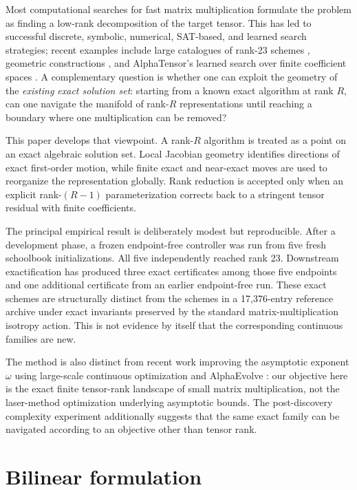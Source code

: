 \documentclass[11pt]{article}
\begin{document}
Most computational searches for fast matrix multiplication formulate the problem as finding a low-rank decomposition of the target tensor.  This has led to successful discrete, symbolic, numerical, SAT-based, and learned search strategies; recent examples include large catalogues of rank-23 schemes \cite{heule2021}, geometric constructions \cite{ballard2019}, and AlphaTensor's learned search over finite coefficient spaces \cite{fawzi2022}.  A complementary question is whether one can exploit the geometry of the \emph{existing exact solution set}: starting from a known exact algorithm at rank $R$, can one navigate the manifold of rank-$R$ representations until reaching a boundary where one multiplication can be removed?

This paper develops that viewpoint.  A rank-$R$ algorithm is treated as a point on an exact algebraic solution set.  Local Jacobian geometry identifies directions of exact first-order motion, while finite exact and near-exact moves are used to reorganize the representation globally.  Rank reduction is accepted only when an explicit rank-$(R-1)$ parameterization corrects back to a stringent tensor residual with finite coefficients.

The principal empirical result is deliberately modest but reproducible.  After a development phase, a frozen endpoint-free controller was run from five fresh schoolbook initializations.  All five independently reached rank 23.  Downstream exactification has produced three exact certificates among those five endpoints and one additional certificate from an earlier endpoint-free run.  These exact schemes are structurally distinct from the schemes in a 17,376-entry reference archive under exact invariants preserved by the standard matrix-multiplication isotropy action.  This is not evidence by itself that the corresponding continuous families are new.

The method is also distinct from recent work improving the asymptotic exponent $\omega$ using large-scale continuous optimization and AlphaEvolve \cite{dupont2026}: our objective here is the exact finite tensor-rank landscape of small matrix multiplication, not the laser-method optimization underlying asymptotic bounds. The post-discovery complexity experiment additionally suggests that the same exact family can be navigated according to an objective other than tensor rank.

\section{Bilinear formulation}
\end{document}
